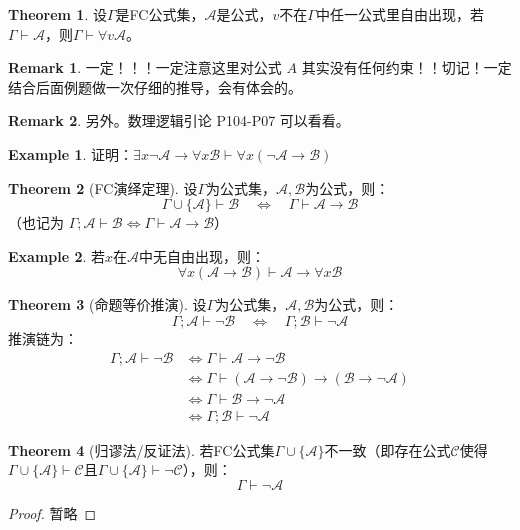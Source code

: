 \documentclass[oneside]{book}
\theoremstyle{definition}
\newtheorem{example}{Example}[section]
\newtheorem{theorem}{Theorem}[section]
\newtheorem{remark}{Remark}[section]
\begin{document}
\begin{theorem}
	设\( \Gamma \)是FC公式集，\( \mathcal{A} \)是公式，\( v \)不在\( \Gamma \)中任一公式里自由出现，若\( \Gamma \vdash \mathcal{A} \)，则\( \Gamma \vdash \forall v \mathcal{A} \)。
\end{theorem}
\begin{remark}
	一定！！！一定注意这里对公式 \(A\) 其实没有任何约束！！切记！一定结合后面例题做一次仔细的推导，会有体会的。
\end{remark}
\begin{remark}
	另外。数理逻辑引论 P104-P07 可以看看。
\end{remark}
\begin{example}
	证明：\( \exists x \neg \mathcal{A} \to \forall x \mathcal{B} \vdash \forall x (\neg \mathcal{A} \to \mathcal{B}) \)
\end{example}

\begin{theorem}[FC演绎定理]
	设\( \Gamma \)为公式集，\( \mathcal{A}, \mathcal{B} \)为公式，则：
	\[
	\Gamma \cup \{ \mathcal{A} \} \vdash \mathcal{B} \quad \iff \quad \Gamma \vdash \mathcal{A} \to \mathcal{B}
	\]
	（也记为 \( \Gamma; \mathcal{A} \vdash \mathcal{B} \iff \Gamma \vdash \mathcal{A} \to \mathcal{B} \)）
\end{theorem}

\begin{example}
	若\( x \)在\( \mathcal{A} \)中无自由出现，则：
	\[
	\forall x (\mathcal{A} \to \mathcal{B}) \vdash \mathcal{A} \to \forall x \mathcal{B}
	\]
\end{example}


\begin{theorem}[命题等价推演]
	设\( \Gamma \)为公式集，\( \mathcal{A}, \mathcal{B} \)为公式，则：
	\[
	\Gamma; \mathcal{A} \vdash \neg\mathcal{B} \quad \iff \quad \Gamma; \mathcal{B} \vdash \neg \mathcal{A}
	\]
	推演链为：
	\[
	\begin{aligned}
		\Gamma; \mathcal{A} \vdash \neg\mathcal{B} &\iff \Gamma \vdash \mathcal{A} \to \neg\mathcal{B} \\
		&\iff \Gamma \vdash (\mathcal{A} \to \neg\mathcal{B}) \to (\mathcal{B} \to \neg \mathcal{A}) \\
		&\iff \Gamma \vdash \mathcal{B} \to \neg \mathcal{A} \\
		&\iff \Gamma; \mathcal{B} \vdash \neg \mathcal{A}
	\end{aligned}
	\]
\end{theorem}


\begin{theorem}[归谬法/反证法]
	若FC公式集\( \Gamma \cup \{ \mathcal{A} \} \)不一致（即存在公式\( \mathcal{C} \)使得\( \Gamma \cup \{ \mathcal{A} \} \vdash \mathcal{C} \)且\( \Gamma \cup \{ \mathcal{A} \} \vdash \neg \mathcal{C} \)），则：
	\[
	\Gamma \vdash \neg \mathcal{A}
	\]
\end{theorem}
\begin{proof}
	暂略
\end{proof}
\end{document}
